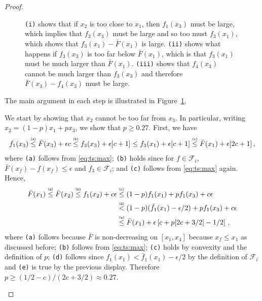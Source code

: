 \documentclass[letter, 12pt]{report}
\newcommand{\explan}[1]{\stackrel{\text{\tiny \texttt{#1}}}}
\newcommand{\sF}{\mathscr F}
\newcommand{\1}{\mathbf{1}}
\theoremstyle{plain}
\theoremstyle{definition}
\theoremstyle{remark}
\begin{document}
\begin{proof}
\begin{figure}[t]
        \caption{
            \texttt{(i)} shows that if $x_2$ is too close to $x_1$, then $f_1(x_3)$ must be large, which implies that $f_3(x_3)$ must be large
            and so too must $f_3(x_1)$, which shows that $f_3(x_1) - \bar F(x_1)$ is large.
            \texttt{(ii)} shows what happens if $f_3(x_3)$ is too far below $\bar F(x_1)$, which is that $f_3(x_1)$ must be much larger than $\bar F(x_1)$.
            \texttt{(iii)} shows that $f_4(x_3)$ cannot be much larger than $f_3(x_3)$ and therefore $\bar F(x_3) - f_4(x_3)$ must be large.
        }
        \label{fig:ts}
    \end{figure}
    The main argument in each step is illustrated in Figure~\ref{fig:ts}.
    \begin{enumsteps}
        \item \label{step:ts:i} We start by showing that $x_2$ cannot be too far from $x_3$.
        In particular, writing $x_2 = (1-p)x_1 + p x_3$, we show that $p \geq 0.27$.
        First, we have
        \begin{align*}
            f_1(x_3)
            \explan{(a)}\leq \bar F(x_3) + \epsilon c
            \explan{(b)}\leq f_3(x_3) + \epsilon[c+1] \leq f_3(x_1) + \epsilon[c+1]
            \explan{(c)}\leq \bar F(x_1) + \epsilon[2c+1] \,,
        \end{align*}
        where \texttt{(a)} follows from \cref{eq:ts:max};
        \texttt{(b)} holds since for $f \in \sF_i$, $\bar F(x_f) - f(x_f) \leq \epsilon$ and $f_3 \in \sF_i$;
        and \texttt{(c)} follows from \cref{eq:ts:max} again.
        Hence,
        \begin{align*}
            \bar F(x_1)
            \explan{(a)}\leq \bar F(x_2)
            \explan{(b)}\leq f_1(x_2) + c\epsilon
             & \explan{(c)}\leq (1 - p) f_1(x_1) + p f_1(x_3) + c\epsilon                    \\
             & \explan{(d)} < (1 - p) (\bar f_1(x_1) - \epsilon/2) + p f_1(x_3) + c\epsilon  \\
             & \explan{(e)}\leq \bar F(x_1) + \epsilon\left[c + p[2c + 3/2] - 1/2\right] \,,
        \end{align*}
        where \texttt{(a)} follows because $\bar F$ is non-decreasing on $[x_1,x_4]$
        because $x_f \leq x_1$ as discussed before;
        \texttt{(b)} follows from \cref{eq:ts:max};
        \texttt{(c)} holds by convexity and the definition of $p$;
        \texttt{(d)} follows since $f_1(x_1) < \bar f_1(x_1) - \epsilon/2$ by the definition of $\sF_i$ and
        \texttt{(e)} is true by the previous display.
        Therefore $p \geq (1/2 - c) / (2c + 3/2) \approx 0.27$.


\end{enumsteps}
\end{proof}
\end{document}
